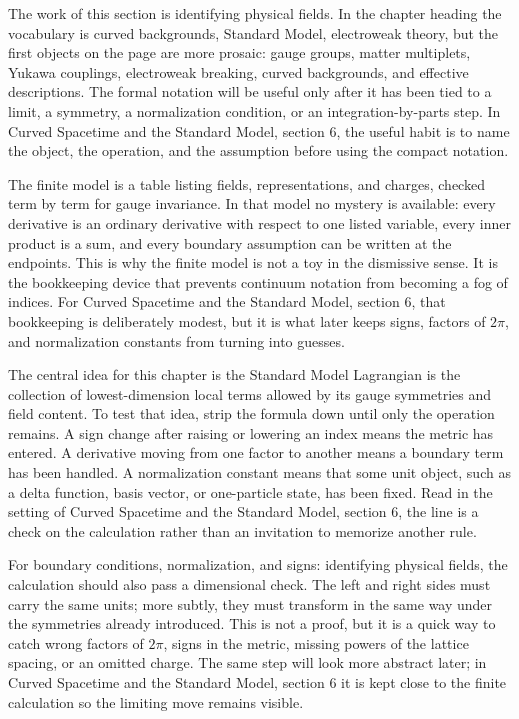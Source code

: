 The work of this section is identifying physical fields.  In the chapter heading the vocabulary is curved backgrounds, Standard Model, electroweak theory, but the first objects on the page are more prosaic: gauge groups, matter multiplets, Yukawa couplings, electroweak breaking, curved backgrounds, and effective descriptions.  The formal notation will be useful only after it has been tied to a limit, a symmetry, a normalization condition, or an integration-by-parts step.  In Curved Spacetime and the Standard Model, section 6, the useful habit is to name the object, the operation, and the assumption before using the compact notation.

The finite model is a table listing fields, representations, and charges, checked term by term for gauge invariance.  In that model no mystery is available: every derivative is an ordinary derivative with respect to one listed variable, every inner product is a sum, and every boundary assumption can be written at the endpoints.  This is why the finite model is not a toy in the dismissive sense.  It is the bookkeeping device that prevents continuum notation from becoming a fog of indices.  For Curved Spacetime and the Standard Model, section 6, that bookkeeping is deliberately modest, but it is what later keeps signs, factors of \(2\pi\), and normalization constants from turning into guesses.

The central idea for this chapter is the Standard Model Lagrangian is the collection of lowest-dimension local terms allowed by its gauge symmetries and field content.  To test that idea, strip the formula down until only the operation remains.  A sign change after raising or lowering an index means the metric has entered.  A derivative moving from one factor to another means a boundary term has been handled.  A normalization constant means that some unit object, such as a delta function, basis vector, or one-particle state, has been fixed.  Read in the setting of Curved Spacetime and the Standard Model, section 6, the line is a check on the calculation rather than an invitation to memorize another rule.

For boundary conditions, normalization, and signs: identifying physical fields, the calculation should also pass a dimensional check.  The left and right sides must carry the same units; more subtly, they must transform in the same way under the symmetries already introduced.  This is not a proof, but it is a quick way to catch wrong factors of \(2\pi\), signs in the metric, missing powers of the lattice spacing, or an omitted charge.  The same step will look more abstract later; in Curved Spacetime and the Standard Model, section 6 it is kept close to the finite calculation so the limiting move remains visible.

